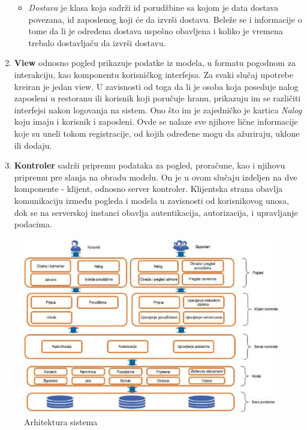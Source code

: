 \begin{enumerate}
\begin{itemize}
         \item \emph{Dostava} je klasa koja sadrži id porudžbine sa kojom je data dostava povezana, id zaposlenog koji će da izvrši dostavu. Beleže se i informacije o tome da li je određena dostava uspešno obavljena i koliko je vremena trebalo dostavljaču da izvrši dostavu. 
    \end{itemize}
    \item \textbf{View} odnosno pogled prikazuje podatke iz modela, u formatu pogodnom za interakciju, kao komponentu korisničkog interfejsa. Za svaki slučaj upotrebe kreiran je jedan view. U zavisnosti od toga da li je osoba koja poseduje nalog zaposleni u restoranu ili korisnik koji poručuje hranu, prikazuju im se različiti interfejsi nakon logovanja na sistem. Ono što im je zajedničko je kartica \emph{Nalog} koju imaju i korisnik i zaposleni. Ovde se nalaze sve njihove lične informacije koje su uneli tokom registracije, od kojih određene mogu da ažuriraju, uklone ili dodaju.
    \item \textbf{Kontroler} sadrži pripremu podataka za pogled, proračune, kao i njihovu pripremu pre slanja na obradu modelu. On je u ovom slučaju izdeljen na dve komponente - klijent, odnosno server kontroler. Klijentska strana obavlja komunikaciju između pogleda i modela u zavisnosti od korisnikovog unosa, dok se na serverskoj instanci obavlja autentikacija, autorizacija, i upravljanje podacima.
\end{enumerate}

\begin{figure}[!ht]
    \leavevmode
    \centering
    \includegraphics[width=1.2\textwidth]{slike/arhitektura.JPG}
    \caption{Arhitektura sistema}
    \label{fig:slika11}
\end{figure}
\leavevmode
